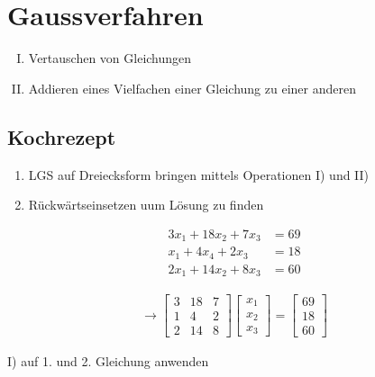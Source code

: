 \documentclass{article}
\begin{document}
    \newpage

    \section{Gaussverfahren}
    \begin{enumerate}[I)]
        \item Vertauschen von Gleichungen
        \item Addieren eines Vielfachen einer Gleichung zu einer anderen
    \end{enumerate}

    \subsection{Kochrezept}

    \begin{enumerate}[1)]
        \item LGS auf Dreiecksform bringen mittels Operationen I) und II)
        \item Rückwärtseinsetzen uum Lösung zu finden
    \end{enumerate}

    \begin{align*}
        3x_1 + 18x_2 + 7x_3 &= 69 \\
        x_1 + 4x_4 + 2x_3 &= 18 \\
        2x_1 + 14x_2 + 8x_3 &= 60
    \end{align*}

    \begin{align*}
        \rightarrow 
        \begin{bmatrix}
            3 & 18 & 7 \\
            1 & 4 & 2 \\
            2 & 14 & 8
        \end{bmatrix}
        \begin{bmatrix}
            x_1 \\ x_2 \\ x_3
        \end{bmatrix}
        = 
        \begin{bmatrix}
            69 \\ 18 \\ 60
        \end{bmatrix}
    \end{align*}

    I) auf 1. und 2. Gleichung anwenden
\end{document}
